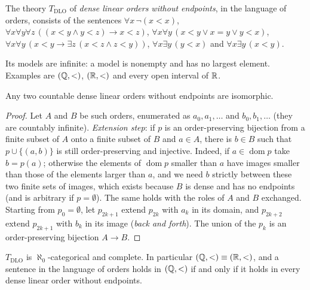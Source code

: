 \begin{definition}\label{model-theory:definition-dlo}
The theory $T_{\mathrm{DLO}}$ of \emph{dense linear orders without endpoints}, in the language of orders, consists of the sentences
$\forall x\,\neg(x < x)$, $\forall x\forall y\forall z\,((x < y \wedge y < z) \to x < z)$, $\forall x\forall y\,(x < y \vee x = y \vee y < x)$,
$\forall x\forall y\,(x < y \to \exists z\,(x < z \wedge z < y))$, $\forall x\exists y\,(y < x)$ and $\forall x\exists y\,(x < y)$.
\end{definition}

Its models are infinite: a model is nonempty and has no largest element. Examples are $(\mathbb{Q}, <)$, $(\mathbb{R}, <)$ and every open interval of $\mathbb{R}$.

\begin{theorem}[Cantor]\label{model-theory:theorem-cantor}
Any two countable dense linear orders without endpoints are isomorphic.
\end{theorem}

\begin{proof}
Let $A$ and $B$ be such orders, enumerated as $a_0, a_1, \ldots$ and $b_0, b_1, \ldots$ (they are countably infinite). \emph{Extension step}: if $p$ is an
order-preserving bijection from a finite subset of $A$ onto a finite subset of $B$ and $a \in A$, there is $b \in B$ such that $p \cup \{(a, b)\}$ is still
order-preserving and injective. Indeed, if $a \in \operatorname{dom}p$ take $b = p(a)$; otherwise the elements of $\operatorname{dom}p$ smaller than $a$ have
images smaller than those of the elements larger than $a$, and we need $b$ strictly between these two finite sets of images, which exists because $B$ is
dense and has no endpoints (and is arbitrary if $p = \emptyset$). The same holds with the roles of $A$ and $B$ exchanged. Starting from $p_0 = \emptyset$, let
$p_{2k+1}$ extend $p_{2k}$ with $a_k$ in its domain, and $p_{2k+2}$ extend $p_{2k+1}$ with $b_k$ in its image (\emph{back and forth}). The union of the
$p_k$ is an order-preserving bijection $A \to B$.
\end{proof}

\begin{corollary}\label{model-theory:corollary-dlo-complete}
$T_{\mathrm{DLO}}$ is $\aleph_0$-categorical and complete. In particular $(\mathbb{Q}, <) \equiv (\mathbb{R}, <)$, and a sentence in the language of orders holds in $(\mathbb{Q}, <)$
if and only if it holds in every dense linear order without endpoints.
\end{corollary}

